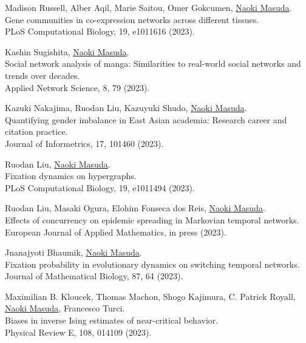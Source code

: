 \documentclass[11pt,letter]{article}
\begin{document}
\begin{etaremune}
\item Madison Russell, Alber Aqil, Marie Saitou, Omer Gokcumen, \underline{Naoki Masuda}.\\
Gene communities in co-expression networks across different tissues.\\
PLoS Computational Biology, 19, e1011616 (2023).

\item Kashin Sugishita, \underline{Naoki Masuda}.\\
Social network analysis of manga: Similarities to real-world social networks and trends over decades.\\
Applied Network Science, 8, 79 (2023).

\item Kazuki Nakajima, Ruodan Liu, Kazuyuki Shudo, \underline{Naoki Masuda}.\\
Quantifying gender imbalance in East Asian academia: Research career and citation practice.\\
Journal of Informetrics, 17, 101460 (2023).

\item Ruodan Liu, \underline{Naoki Masuda}.\\
Fixation dynamics on hypergraphs.\\
PLoS Computational Biology, 19, e1011494 (2023).

\item Ruodan Liu, Masaki Ogura, Elohim Fonseca dos Reis, \underline{Naoki Masuda}.\\
Effects of concurrency on epidemic spreading in Markovian temporal networks.\\
European Journal of Applied Mathematics, in press (2023).

\item Jnanajyoti Bhaumik, \underline{Naoki Masuda}.\\
Fixation probability in evolutionary dynamics on switching temporal networks.\\
Journal of Mathematical Biology, 87, 64 (2023).

\item Maximilian B. Kloucek, Thomas Machon, Shogo Kajimura, C. Patrick Royall, \underline{Naoki Masuda}, Francesco Turci.\\
Biases in inverse Ising estimates of near-critical behavior.\\
Physical Review E, 108, 014109 (2023).


\end{etaremune}
\end{document}
